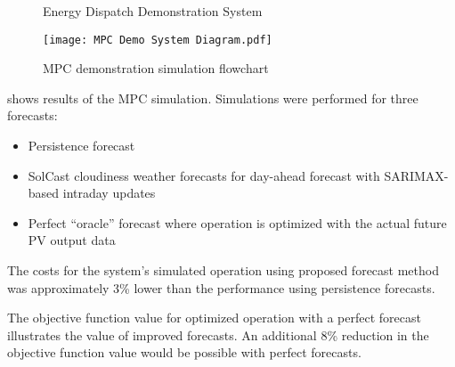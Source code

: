 \begin{figure}[tb]
	\centering
	\fontsize{6pt}{7pt}\selectfont
	\def\svgwidth{0.8\columnwidth}
	
	\caption{Energy Dispatch Demonstration System}
	\label{fig:demo-system}
\end{figure}

\begin{figure}[tb]
	\centering
	\texttt{[image: MPC Demo System Diagram.pdf]}
	\caption{MPC demonstration simulation flowchart}
	\label{fig:mpc-simulation-flowchart}
\end{figure}

  shows results of the MPC simulation. Simulations were performed for three forecasts:

\begin{itemize}
\item Persistence forecast
\item SolCast cloudiness weather forecasts for day-ahead forecast with SARIMAX-based intraday updates
\item Perfect ``oracle'' forecast where operation is optimized with the actual future PV output data
\end{itemize}

The costs for the system's simulated operation using proposed forecast method was approximately
3\% lower than the performance using persistence forecasts.

The objective function value for optimized operation with a perfect forecast illustrates the value of improved forecasts.
An additional 8\% reduction in the objective function value would be possible with perfect forecasts.

